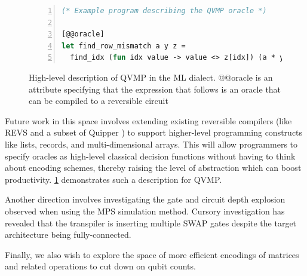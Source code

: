 \documentclass[11pt]{article}
\theoremstyle{definition}
\theoremstyle{remark}
\begin{document}
\begin{figure}
  \begin{lstlisting}[frame=single,language=ML, numbers=left]
(* Example program describing the QVMP oracle *)

[@@oracle]
let find_row_mismatch a y z =
  find_idx (fun idx value -> value <> z[idx]) (a * y)
  \end{lstlisting}
  \caption{High-level description of QVMP in the ML dialect.
  @@oracle is an attribute specifying that the expression that
  follows is an oracle that can be compiled to a reversible circuit}
  \label{fig:high_level_qvmp_oracle}
\end{figure}

Future work in this space involves extending existing reversible compilers (like
REVS \cite{amy2017verified} and a subset of Quipper \cite{green2013quipper}) to
support higher-level programming constructs like lists, records, and
multi-dimensional arrays. This will allow programmers to specify oracles as
high-level classical decision functions without having to think about encoding
schemes, thereby raising the level of abstraction which can boost productivity.
\cref{fig:high_level_qvmp_oracle} demonstrates such a description for QVMP.

Another direction involves investigating the gate and circuit depth
explosion observed when using the MPS simulation method. Cursory
investigation has revealed that the transpiler is inserting multiple SWAP gates
despite the target architecture being fully-connected.

Finally, we also wish to explore the space of more efficient encodings of
matrices and related operations to cut down on qubit counts.

\newpage

\printbibliography[title=Bibliography]
\end{document}
